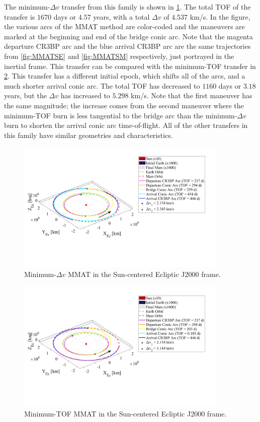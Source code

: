 The minimum-$\Delta v$ transfer from this family is shown in \cref{fig:MMATDv}. The total TOF of
the transfer is $1670$ days or $4.57$ years, with a total $\Delta v$ of $4.537$ km/s. In the
figure, the various arcs of the MMAT method are color-coded and the maneuvers are marked at the
beginning and end of the bridge conic arc. Note that the magenta departure CR3BP arc and the blue
arrival CR3BP arc are the same trajectories from \cref{fig:MMATSE} and \cref{fig:MMATSM}
respectively, just portrayed in the inertial frame. This transfer can be compared with the
minimum-TOF transfer in \cref{fig:MMATTOF}. This transfer has a different initial epoch, which
shifts all of the arcs, and a much shorter arrival conic arc. The total TOF has decreased to $1160$
days or $3.18$ years, but the $\Delta v$ has increased to $5.298$ km/s. Note that the first
maneuver has the same magnitude; the increase comes from the second maneuver where the minimum-TOF
burn is less tangential to the bridge arc than the minimum-$\Delta v$ burn to shorten the arrival
conic arc time-of-flight. All of the other transfers in this family have similar geometries and
characteristics.

\begin{figure}[ht]
    \centering
    \includegraphics[width=0.9\textwidth]{figures/MinDvMMAT.pdf}
    \caption{Minimum-$\Delta v$ MMAT in the Sun-centered Ecliptic J2000 frame.}
    \label{fig:MMATDv}
\end{figure}

\begin{figure}[ht]
    \centering
    \includegraphics[width=0.9\textwidth]{figures/MinTOFMMAT.pdf}
    \caption{Minimum-TOF MMAT in the Sun-centered Ecliptic J2000 frame.}
    \label{fig:MMATTOF}
\end{figure}
